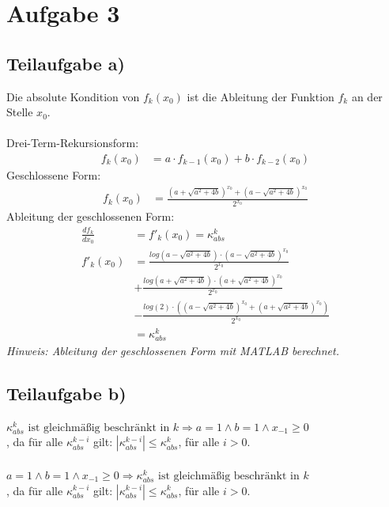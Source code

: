 \documentclass{llncs}
\begin{document}
\section*{Aufgabe 3}
\subsection*{Teilaufgabe a)}

Die absolute Kondition von $f_k(x_0)$ ist die Ableitung der Funktion $f_k$ an der Stelle $x_0$.\\
\\
Drei-Term-Rekursionsform:
\begin{align*}
f_k(x_0) &= a \cdot f_{k-1}(x_0) + b \cdot f_{k-2}(x_0)
\end{align*}
Geschlossene Form:
\begin{align*}
f_k(x_0) &= \frac{\left( a + \sqrt{a^2 + 4b} \right)^{x_0} + \left( a - \sqrt{a^2 + 4b} \right)^{x_0}}{2^{x_0}}
\end{align*}
Ableitung der geschlossenen Form:
\begin{align*}
\frac{df_k}{dx_0} &= f'_k(x_0) = \kappa_{abs}^k \\
f'_k(x_0) &= \frac{log(a-\sqrt{a^2+4b}) \cdot (a-\sqrt{a^2+4b})^{x_0}}{2^{x_0}} \\
& + \frac{log(a+\sqrt{a^2+4b}) \cdot (a+\sqrt{a^2 + 4b})^{x_0}}{2^{x_0}} \\
& - \frac{log(2) \cdot ((a-\sqrt{a^2+4b})^{x_0} + (a+\sqrt{a^2+4b})^{x_0})}{2^{x_0}} \\
&= \kappa_{abs}^k
\end{align*}
\textit{Hinweis: Ableitung der geschlossenen Form mit MATLAB berechnet.}

\subsection*{Teilaufgabe b)}

$\kappa_{abs}^k \text{ ist gleichmäßig beschränkt in } k \Rightarrow a = 1 \wedge b = 1 \wedge x_{-1} \geq 0$\\
, da für alle $\kappa_{abs}^{k-i}$ gilt: $|\kappa_{abs}^{k-i}| \leq \kappa_{abs}^{k}$, für alle $i > 0$.\\
\\
$a = 1 \wedge b = 1 \wedge x_{-1} \geq 0 \Rightarrow \kappa_{abs}^k \text{ ist gleichmäßig beschränkt in } k$\\
, da für alle $\kappa_{abs}^{k-i}$ gilt: $|\kappa_{abs}^{k-i}| \leq \kappa_{abs}^{k}$, für alle $i > 0$.\\
\end{document}
